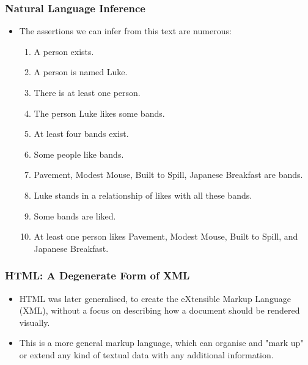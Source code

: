 \documentclass{beamer}
\begin{document}
\begin{frame}
\frametitle{Natural Language Inference}

\begin{itemize}

\item The assertions we can infer from this text are numerous:

\begin{enumerate}
  \item A person exists.
  \item A person is named Luke.
  \item There is at least one person.
  \item The person Luke likes some bands.
  \item At least four bands exist.
  \item Some people like bands.
  \item Pavement, Modest Mouse, Built to Spill, Japanese Breakfast are bands.
  \item Luke stands in a relationship of likes with all these bands.
  \item Some bands are liked.
  \item At least one person likes Pavement, Modest Mouse, Built to Spill, and
  Japanese Breakfast.
\end{enumerate}

\end{itemize}

\end{frame}

\begin{frame}
\frametitle{HTML: A Degenerate Form of XML}

\begin{itemize}
  \item HTML was later generalised, to create the eXtensible Markup Language
  (XML), without a focus on describing how a document should be rendered
  visually.
  \item This is a more general markup language, which can organise and "mark up" 
  or extend any kind of textual data with any additional information.
\end{itemize}

\end{frame}
\end{document}
